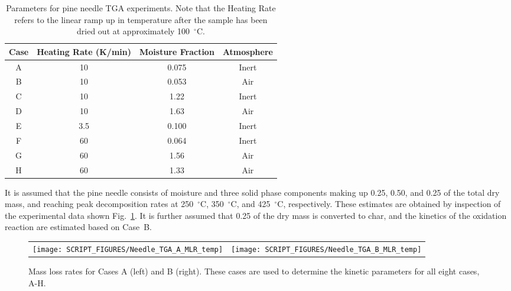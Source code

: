 \documentclass[11pt]{book}
\begin{document}
\begin{table}[!ht]
\centering
\caption[Parameters for pine needle TGA experiments]{Parameters for pine needle TGA experiments. Note that the Heating Rate refers to the linear ramp up in temperature after the sample has been dried out at approximately 100~$^\circ$C.}
\label{Needle_TGA_table}
\begin{tabular}{|c|c|c|c|}
\hline
Case & Heating Rate (K/min)  & Moisture Fraction & Atmosphere \\ \hline
A    & 10                    & 0.075             & Inert      \\
B    & 10                    & 0.053             & Air        \\
C    & 10                    & 1.22              & Inert      \\
D    & 10                    & 1.63              & Air        \\
E    & 3.5                   & 0.100             & Inert      \\
F    & 60                    & 0.064             & Inert      \\
G    & 60                    & 1.56              & Air        \\
H    & 60                    & 1.33              & Air        \\ \hline
\end{tabular}
\end{table}

It is assumed that the pine needle consists of moisture and three solid phase components making up 0.25, 0.50, and 0.25 of the total dry mass, and reaching peak decomposition rates at 250~$^\circ$C, 350~$^\circ$C, and 425~$^\circ$C, respectively. These estimates are obtained by inspection of the experimental data shown Fig.~\ref{Needle_TGA_plot_A_B_temp}. It is further assumed that 0.25 of the dry mass is converted to char, and the kinetics of the oxidation reaction are estimated based on Case~B.

\begin{figure}[!h]
\begin{tabular*}{\textwidth}{l@{\extracolsep{\fill}}r}
\texttt{[image: SCRIPT\_FIGURES/Needle\_TGA\_A\_MLR\_temp]} &
\texttt{[image: SCRIPT\_FIGURES/Needle\_TGA\_B\_MLR\_temp]}
\end{tabular*}
\caption[Needle\_TGA calibration curves]{Mass loss rates for Cases A (left) and B (right). These cases are used to determine the kinetic parameters for all eight cases, A-H.}
\label{Needle_TGA_plot_A_B_temp}
\end{figure}
\end{document}
